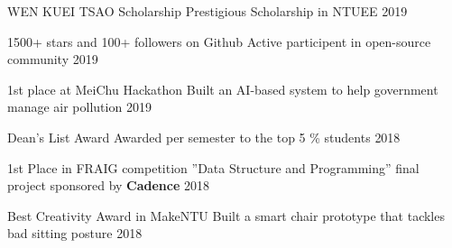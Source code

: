\cvsubsection{}

\begin{cvhonors}

\cvhonor
    {WEN KUEI TSAO Scholarship} %
    {Prestigious Scholarship in NTUEE} %
    {} %
    {2019} %


  \cvhonor
    {1500+ stars and 100+ followers on Github} %
    {Active participent in open-source community} %
    {} %
    {2019} %

  \cvhonor
    {1st place at MeiChu Hackathon} %
    {Built an AI-based system to help government manage air pollution} %
    {} %
    {2019} %

  \cvhonor
    {Dean's List Award} %
    {Awarded per semester to the top 5 \% students} %
    {} %
    {2018} %

  \cvhonor
    {1st Place in FRAIG competition} %
    {”Data Structure and Programming” final project sponsored by \textbf{Cadence}} %
    {} %
    {2018} %

  \cvhonor
    {Best Creativity Award in MakeNTU} %
    {Built a smart chair prototype that tackles bad sitting posture} %
    {} %
    {2018} %

\end{cvhonors}
